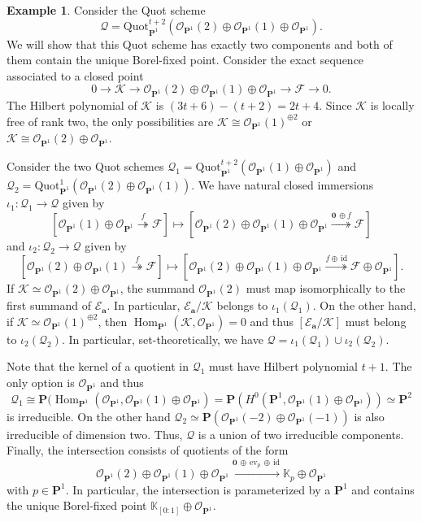 \documentclass[leqno,11pt,a4paper]{amsart}
\theoremstyle{definition}
\newtheorem{example}[example]{Example}
\numberwithin{equation}{section}
\newcommand{\kk}{\mathbb{K}}
\newcommand{\bfa}{\mathbf{a}}
\newcommand{\Quot}{\mathrm{Quot}}
\newcommand{\PP}{\mathbf{P}}
\newcommand{\EE}{\mathscr{E}}
\newcommand{\FF}{\mathscr{F}}
\newcommand{\OO}{\mathscr{O}}
\newcommand{\KK}{\mathscr{K}}
\newcommand{\QQ}{\mathcal{Q}}
\DeclareMathOperator{\Hom}{Hom}
\begin{document}
\begin{example} \label{non_distinguish} 
Consider the Quot scheme 
$$
\QQ = \Quot_{\PP^1}^{t+2}
\left(
\OO_{\PP^1}(2) \oplus \OO_{\PP^1}(1)\oplus\OO_{\PP^1}
\right).
$$
We will show that this Quot scheme has exactly two components and both of them contain the unique Borel-fixed point. Consider the exact sequence associated to a closed point
$$
0 \longrightarrow \KK \longrightarrow \OO_{\PP^1}(2) \oplus \OO_{\PP^1}(1)\oplus\OO_{\PP^1} 
\longrightarrow \FF \longrightarrow 0.
$$
The Hilbert polynomial of $\KK$ is $(3t+6) - (t+2) = 2t+4$. 
Since $\KK$ is locally free of rank two, the only possibilities are $\KK \cong \OO_{\PP^1}(1)^{\oplus 2}$ or $\KK \cong \OO_{\PP^1}(2) \oplus \OO_{\PP^1}$.

Consider the two Quot schemes
$\QQ_1=\Quot_{\PP^1}^{t+2}(\OO_{\PP^1}(1) \oplus \OO_{\PP^1})$ and $\QQ_2=\Quot_{\PP^1}^{1}(\OO_{\PP^1}(2) \oplus \OO_{\PP^1}(1))$.
We have natural closed immersions $\iota_1:\QQ_1 \to \QQ$ given by 
$$
[\OO_{\PP^1}(1) \oplus \OO_{\PP^1} \overset{f}{\twoheadrightarrow} \FF] \mapsto 
[\OO_{\PP^1}(2) \oplus \OO_{\PP^1}(1) \oplus \OO_{\PP^1} \overset{\boldsymbol{0} \, \oplus f}{\twoheadrightarrow}\FF]
$$
and  $\iota_2:\QQ_2 \to \QQ$ given by
$$
[\OO_{\PP^1}(2)\oplus\OO_{\PP^1}(1) \overset{f}{\twoheadrightarrow}  \FF] \mapsto
[\OO_{\PP^1}(2)\oplus\OO_{\PP^1}(1)\oplus\OO_{\PP^1} \overset{f \oplus \, \text{id}}{\twoheadrightarrow} \FF \oplus \OO_{\PP^1}].
$$
If $\KK\simeq\OO_{\PP^1}(2) \oplus\OO_{\PP^1}$, the summand $\OO_{\PP^1}(2)$ must map isomorphically to the first summand of $\EE_\bfa$. 
In particular, $\EE_{\bfa}/\KK$ belongs to $\iota_1(\QQ_1)$.
On the other hand, if $\KK\simeq\OO_{\PP^1}(1)^{\oplus2}$, then $\Hom_{\PP^1}(\KK,\OO_{\PP^1})=0$ and thus $[\EE_\bfa/\KK]$ must belong to $\iota_2(\QQ_2)$.
In particular, set-theoretically, we have $\QQ=\iota_1(\QQ_1) \cup \iota_2(\QQ_2)$.

Note that the kernel of a quotient in $\QQ_1$ must have Hilbert polynomial $t+1$. 
The only option is $\OO_{\PP^1}$ and thus
$$
\QQ_1 \cong \PP(\Hom_{\PP^1}(\OO_{\PP^1},\OO_{\PP^1}(1) \oplus \OO_{\PP^1}) = 
\PP(H^0(\PP^1,\OO_{\PP^1}(1) \oplus \OO_{\PP^1})) \simeq \PP^2
$$
is irreducible.
On the other hand $\QQ_2 \simeq \PP(\OO_{\PP^1}(-2)\oplus \OO_{\PP^1}(-1))$ is also irreducible of dimension two. 
Thus, $\QQ$ is a union of two irreducible components.
Finally, the intersection consists of quotients of the form
$$
\OO_{\PP^1}(2)\oplus\OO_{\PP^1}(1)\oplus\OO_{\PP^1} \xrightarrow{\mathbf{0} \, \oplus \, \mathrm{ev}_p \, \oplus \, \mathrm{id}} \kk_p \oplus \OO_{\PP^1} 
$$
with $p \in \PP^1$. 
In particular, the intersection is parameterized by a $\PP^1$ and contains the unique Borel-fixed point $\kk_{[0:1]} \oplus \OO_{\PP^1}$.
\end{example}
\end{document}

